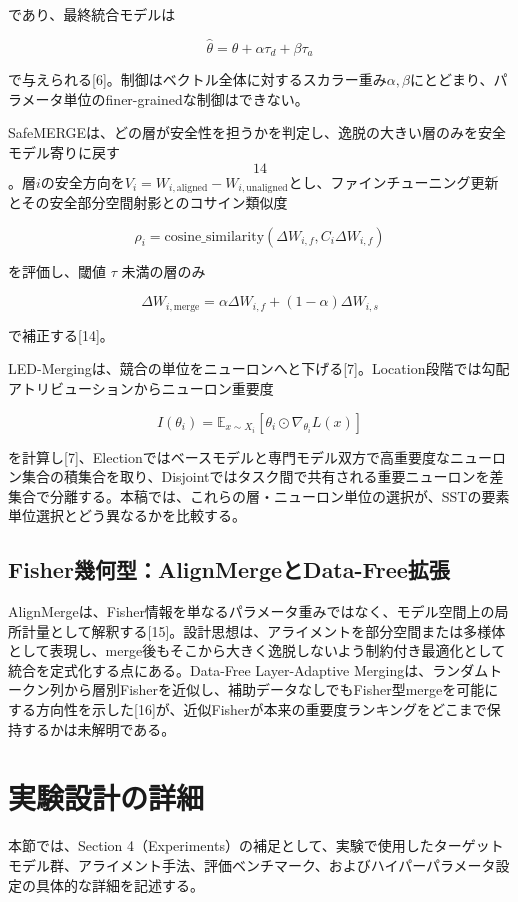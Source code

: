 であり、最終統合モデルは

\[
\hat\theta=\theta+\alpha\tau_d+\beta\tau_a
\tag{9}
\]

で与えられる[6]。制御はベクトル全体に対するスカラー重み\(\alpha,\beta\)にとどまり、パラメータ単位のfiner-grainedな制御はできない。

SafeMERGEは、どの層が安全性を担うかを判定し、逸脱の大きい層のみを安全モデル寄りに戻す\[14\]。層\(i\)の安全方向を\(V_i=W_{i,\mathrm{aligned}}-W_{i,\mathrm{unaligned}}\)とし、ファインチューニング更新とその安全部分空間射影とのコサイン類似度

\[
\rho_i=\mathrm{cosine\_similarity}(\Delta W_{i,f},C_i\Delta W_{i,f})
\tag{10}
\]

を評価し、閾値 \(\tau\) 未満の層のみ

\[
\Delta W_{i,\mathrm{merge}}=\alpha\Delta W_{i,f}+(1-\alpha)\Delta W_{i,s}
\tag{11}
\]

で補正する[14]。

LED-Mergingは、競合の単位をニューロンへと下げる[7]。Location段階では勾配アトリビューションからニューロン重要度

\[
I(\theta_i)=\mathbb{E}_{x\sim X_i}[\theta_i\odot\nabla_{\theta_i}L(x)]
\tag{12}
\]

を計算し[7]、Electionではベースモデルと専門モデル双方で高重要度なニューロン集合の積集合を取り、Disjointではタスク間で共有される重要ニューロンを差集合で分離する。本稿では、これらの層・ニューロン単位の選択が、SSTの要素単位選択とどう異なるかを比較する。

\subsection{Fisher幾何型：AlignMergeとData-Free拡張}

AlignMergeは、Fisher情報を単なるパラメータ重みではなく、モデル空間上の局所計量として解釈する[15]。設計思想は、アライメントを部分空間または多様体として表現し、merge後もそこから大きく逸脱しないよう制約付き最適化として統合を定式化する点にある。Data-Free Layer-Adaptive Mergingは、ランダムトークン列から層別Fisherを近似し、補助データなしでもFisher型mergeを可能にする方向性を示した[16]が、近似Fisherが本来の重要度ランキングをどこまで保持するかは未解明である。

\section{実験設計の詳細}
本節では、Section 4（Experiments）の補足として、実験で使用したターゲットモデル群、アライメント手法、評価ベンチマーク、およびハイパーパラメータ設定の具体的な詳細を記述する。

